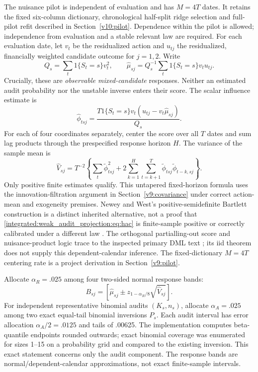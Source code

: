 The nuisance pilot is independent of evaluation and has $M=4T$ dates. It
retains the fixed six-column dictionary, chronological half-split ridge
selection and full-pilot refit described in Section~\ref{v10:pilot}. Dependence within the pilot is allowed;
independence from evaluation and a stable relevant law are required. For each
evaluation date, let $v_t$ be the residualized action and $u_{tj}$ the
residualized, financially weighted candidate outcome for $j=1,2$. Write
\begin{equation}
 Q_s=\sum_t1\{S_t=s\}v_t^2,\qquad
 \widehat\mu_{sj}=Q_s^{-1}\sum_t1\{S_t=s\}v_tu_{tj}.
\end{equation}
Crucially, these are \emph{observable mixed-candidate} responses. Neither
an estimated audit probability nor the unstable inverse enters their score.
The scalar influence estimate is
\begin{equation}\label{integrated:weak_audit_projection:eq:score}
 \widehat\phi_{tsj}=\frac{T1\{S_t=s\}v_t
 (u_{tj}-v_t\widehat\mu_{sj})}{Q_s}.
\end{equation}
For each of four coordinates separately, center the score over all $T$ dates
and sum lag products through the prespecified response horizon $H$. The
variance of the sample mean is
\begin{equation}\label{integrated:weak_audit_projection:eq:hac}
 \widehat V_{sj}=T^{-2}\left\{\sum_t\widetilde\phi_{tsj}^2+
 2\sum_{k=1}^{H}\sum_{t=k+1}^{T}
 \widetilde\phi_{tsj}\widetilde\phi_{t-k,sj}\right\}.
\end{equation}
Only positive finite estimates qualify. This untapered fixed-horizon formula
uses the innovation-filtration argument in Section~\ref{v9:covariance}
under correct action-mean and exogeneity premises. Newey and West's positive-semidefinite Bartlett
construction is a distinct inherited alternative, not a proof that
\eqref{integrated:weak_audit_projection:eq:hac} is finite-sample positive or correctly calibrated under a
different law \citep{newey1986}. The orthogonal partialling-out score and
nuisance-product logic trace to the inspected primary DML text
\citep{dml2018}; its iid theorem does not supply this dependent-calendar
inference. The fixed-dictionary $M=4T$ centering rate is a project derivation
in Section~\ref{v9:pilot}.

Allocate $\alpha_R=.025$ among four two-sided normal response bands:
\begin{equation}
 B_{sj}=\left[\widehat\mu_{sj}\pm
 z_{1-\alpha_R/8}\sqrt{\widehat V_{sj}}\right].
\end{equation}
For independent representative binomial audits $(K_s,n_s)$, allocate
$\alpha_A=.025$ among two exact equal-tail binomial inversions $P_s$. Each
audit interval has error allocation $\alpha_A/2=.0125$ and tails of .00625.
The implementation computes beta-quantile endpoints rounded outwards; exact
binomial coverage was enumerated for sizes 1--15 on a probability grid and
compared to the existing inversion. This exact statement concerns only the
audit component. The response bands are normal/dependent-calendar
approximations, not exact finite-sample intervals.

